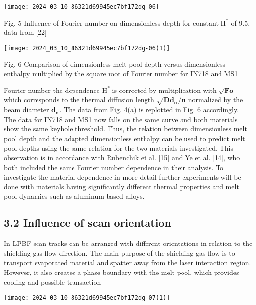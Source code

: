 \documentclass[10pt]{article}
\begin{document}
\begin{center}
\texttt{[image: 2024\_03\_10\_86321d69945ec7bf172dg-06]}
\end{center}

Fig. 5 Influence of Fourier number on dimensionless depth for constant $\mathrm{H}^{*}$ of 9.5, data from [22]

\begin{center}
\texttt{[image: 2024\_03\_10\_86321d69945ec7bf172dg-06(1)]}
\end{center}

Fig. 6 Comparison of dimensionless melt pool depth versus dimensionless enthalpy multiplied by the square root of Fourier number for IN718 and MS1

Fourier number the dependence $\mathrm{H}^{*}$ is corrected by multiplication with $\sqrt{\boldsymbol{F o}}$ which corresponds to the thermal diffusion length $\sqrt{\boldsymbol{D} \boldsymbol{d}_{\boldsymbol{\sigma}} / \boldsymbol{u}}$ normalized by the beam diameter $\boldsymbol{d}_{\boldsymbol{\sigma}}$. The data from Fig. 4(a) is replotted in Fig. 6 accordingly. The data for IN718 and MS1 now falls on the same curve and both materials show the same keyhole threshold. Thus, the relation between dimensionless melt pool depth and the adapted dimensionless enthalpy can be used to predict melt pool depths using the same relation for the two materials investigated. This observation is in accordance with Rubenchik et al. [15] and Ye et al. [14], who both included the same Fourier number dependence in their analysis. To investigate the material dependence in more detail further experiments will be done with materials having significantly different thermal properties and melt pool dynamics such as aluminum based alloys.

\subsection*{3.2 Influence of scan orientation}
In LPBF scan tracks can be arranged with different orientations in relation to the shielding gas flow direction. The main purpose of the shielding gas flow is to transport evaporated material and spatter away from the laser interaction region. However, it also creates a phase boundary with the melt pool, which provides cooling and possible transaction

\begin{center}
\texttt{[image: 2024\_03\_10\_86321d69945ec7bf172dg-07(1)]}
\end{center}
\end{document}
